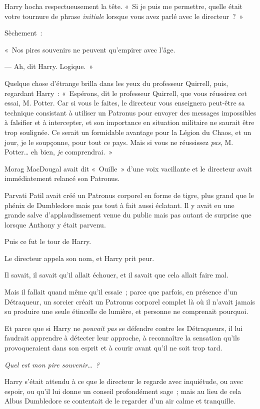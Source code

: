 Harry hocha respectueusement la tête. «~Si je puis me permettre, quelle était votre tournure de phrase \emph{initiale} lorsque vous avez parlé avec le directeur~?~»

Sèchement~:

«~Nos pires souvenirs ne peuvent qu'empirer avec l'âge.

--- Ah, dit Harry. Logique.~»

Quelque chose d'étrange brilla dans les yeux du professeur Quirrell, puis, regardant Harry~: «~Espérons, dit le professeur Quirrell, que vous réussirez cet essai, M. Potter. Car si vous le faites, le directeur vous enseignera peut-être sa technique consistant à utiliser un Patronus pour envoyer des messages impossibles à falsifier et à intercepter, et son importance en situation militaire ne saurait être trop soulignée. Ce serait un formidable avantage pour la Légion du Chaos, et un jour, je le soupçonne, pour tout ce pays. Mais si vous ne réussissez \emph{pas}, M. Potter… eh bien, \emph{je} comprendrai.~»

\later

Morag MacDougal avait dit «~Ouille~» d'une voix vacillante et le directeur avait immédiatement relancé son Patronus.

Parvati Patil avait créé un Patronus corporel en forme de tigre, plus grand que le phénix de Dumbledore mais pas tout à fait aussi éclatant. Il y avait eu une grande salve d'applaudissement venue du public mais pas autant de surprise que lorsque Anthony y était parvenu.

Puis ce fut le tour de Harry.

Le directeur appela son nom, et Harry prit peur.

Il savait, il savait qu'il allait échouer, et il savait que cela allait faire mal.

Mais il fallait quand même qu'il essaie~; parce que parfois, en présence d'un Détraqueur, un sorcier créait un Patronus corporel complet là où il n'avait jamais su produire une seule étincelle de lumière, et personne ne comprenait pourquoi.

Et parce que si Harry ne \emph{pouvait pas} se défendre contre les Détraqueurs, il lui faudrait apprendre à détecter leur approche, à reconnaître la sensation qu'ils provoqueraient dans son esprit et à courir avant qu'il ne soit trop tard.

\emph{Quel est mon pire souvenir…~?}

Harry s'était attendu à ce que le directeur le regarde avec inquiétude, ou avec espoir, ou qu'il lui donne un conseil profondément sage~; mais au lieu de cela Albus Dumbledore se contentait de le regarder d'un air calme et tranquille.

